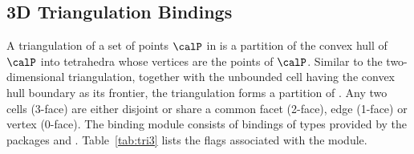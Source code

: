 \subsection{3D Triangulation Bindings}
\label{ssec:modules:tri3}
A triangulation of a set of points $\calP$ in \Rthree is a partition of the convex hull of $\calP$ into tetrahedra whose vertices are the points of $\calP$. Similar to the two-dimensional triangulation, together with the unbounded cell having the convex hull boundary as its frontier, the triangulation forms a partition of \Rthree. Any two cells (3-face) are either disjoint or share a common facet (2-face), edge (1-face) or vertex (0-face).  The binding module \iiiDTriangulationsPackage{} consists of bindings of types provided by the \cgal{} packages \iiiDTriangulationsPackage{} and \iiiDPeriodicTriangulationsPackage{}. Table~\ref{tab:tri3} lists the \cmake{} flags associated with the \iiiDTriangulationsPackage{} module.

\begin{table}[!htp]
  \caption{\iiiDTriangulationsPackage{} module flags. For the default
  value of the traits name see Table~\ref{tab:tri3:traits-default}.}
  \centering{}
  \label{tab:tri3}
\end{table}

